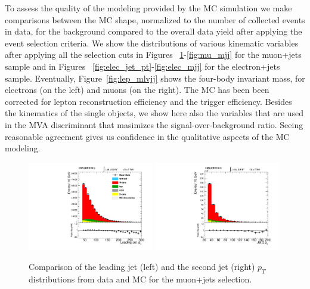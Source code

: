 To assess the quality of the modeling provided by the MC simulation we 
make comparisons between the MC shape, normalized to the number of collected events in data,
for the background compared to the overall data
yield after applying the event selection criteria. 
We show the distributions of various kinematic
variables after applying all the selection cuts in 
Figures ~\ref{fig:mu_jet_pt}-\ref{fig:mu_mjj}
for the muon+jets sample and in 
Figures ~\ref{fig:elec_jet_pt}-\ref{fig:elec_mjj} for
the electron+jets sample. 
Eventually, Figure~\ref{fig:lep_mlvjj} shows the four-body invariant mass,
for electrons (on the left) 
and muons (on the right).
The MC has been been corrected for
lepton reconstruction efficiency and the trigger efficiency.
Besides the kinematics of the single objects, 
we show here also the variables that are used in the MVA discriminant
that masimizes the signal-over-background ratio.
Seeing reasonable agreement gives us confidence in
the qualitative aspects of the MC modeling. 
\begin{figure}[ht]
  {\centering
    \includegraphics[width=0.49\textwidth]{plots/2012_DataMC/mu_jetld_pt.pdf}
    \includegraphics[width=0.49\textwidth]{plots/2012_DataMC/mu_jetnt_pt.pdf}
    \caption{Comparison of the leading jet (left) and 
      the second jet (right) $p_{T}$ distributions from data and MC for the muon+jets
      selection.}
    \label{fig:mu_jet_pt}}
\end{figure}
